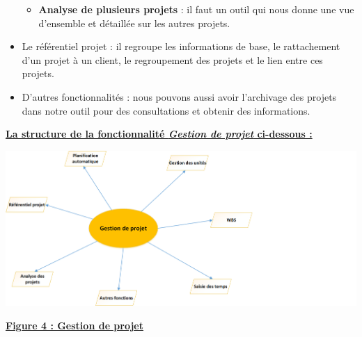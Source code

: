 \documentclass[11pt]{report}
\begin{document}
\begin{itemize}
\begin{itemize}
		\item \textbf{Analyse de plusieurs projets} : il faut un outil qui nous donne une vue d’ensemble et détaillée sur les autres projets.
	\end{itemize}
	
	\item Le référentiel projet : il regroupe les informations de base, le rattachement d’un projet à un client, le regroupement des projets et le lien entre ces projets.
	
	\item D’autres fonctionnalités :  nous pouvons aussi avoir l’archivage des projets dans notre outil pour des consultations et obtenir des informations.
\end{itemize}

\newpage
\begin{center}
\underline{\textbf{La structure de la fonctionnalité \textit{Gestion de projet} ci-dessous :}}
\end{center}

\begin{center}
\includegraphics[scale=0.8]{images/figure4.png} 
\quad

\underline{\textbf{Figure 4 : Gestion de projet}}
\end{center}
\quad
\end{document}
